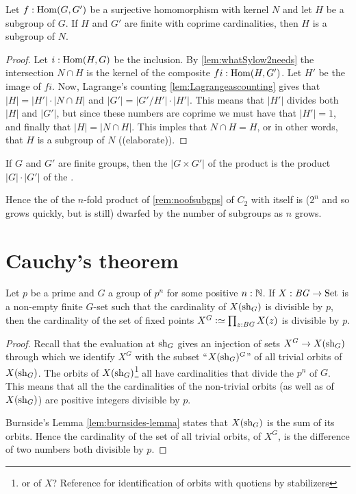 \begin{corollary}
  \label{cor:whatSylow2needs}Let $f:\Hom(G,G')$ be a surjective homomorphism with kernel $N$ and let $H$ be a subgroup of $G$.  If $H$ and $G'$ are finite with coprime cardinalities, then $H$ is a subgroup of $N$.
\end{corollary}
\begin{proof}
  Let $i:\Hom(H,G)$ be the inclusion.  By \cref{lem:whatSylow2needs} the intersection $N\cap H$ is the kernel of the composite $fi:\Hom(H,G')$.  Let $H'$ be the image of $fi$. Now, Lagrange's counting \cref{lem:Lagrangeascounting} gives that $|H|=|H'|\cdot |N\cap H|$ and $|G'|=|G'/H'|\cdot|H'|$.  This means that $|H'|$ divides both $|H|$ and $|G'|$, but since these numbers are coprime we must have that $|H'|=1$, and finally that $|H|=|N\cap H|$.  This imples that $N\cap H=H$, or in other words, that $H$ is a subgroup of $N$ ((elaborate)).
\end{proof}

\begin{corollary}
  If $G$ and $G'$ are finite groups, then the \gporder $|G\times G'|$ of the product is the product $|G|\cdot| G'|$ of the \gporders.
\end{corollary}
\begin{remark}
  Hence the \gporder of the $n$-fold product of \cref{rem:noofsubgps} of $C_2$ with itself is ($2^n$ and so grows quickly, but is still) dwarfed by the number of subgroups as $n$ grows.
\end{remark}


\section{Cauchy's theorem}
\begin{lemma}
  \label{lem:fixedptsize}
  Let $p$ be a prime and $G$ a group of \gporder $p^n$ for some positive $n:\mathbb{N}$.  If $X:\mathit{B}\mathit{G}\to\mathrm{Set}$ is a non-empty finite $G$-set such that the cardinality of $X(\mathrm{sh}_G)$ is divisible by $p$, then the cardinality of the set of fixed points $X^G\defequi\prod_{z:\BG}X(z)$ is divisible by $p$.
\end{lemma}
\begin{proof}
  Recall that the evaluation at $\mathrm{sh}_G$ gives an injection of sets $X^G\to X(\mathrm{sh}_G)$ through which we identify $X^G$ with the subset ``$X(\mathrm{sh}_G)^G$'' of all trivial orbits of $X(\mathrm{sh}_G)$.
 The orbits of $X(\mathrm{sh}_G)$\footnote{or of $X$?  Reference for identification of orbits with quotiens by stabilizers} all have cardinalities that divide the \gporder $p^n$ of $G$.  
This means that all the the cardinalities of the non-trivial orbits (as well as of $X(\mathrm{sh}_G)$) are positive integers divisible by $p$. 

 Burnside's Lemma \cref{lem:burnsides-lemma} states that $X(\mathrm{sh}_G)$ is the sum of its orbits.
Hence the cardinality of the set of all trivial orbits, \ie of $X^G$, is the difference of two numbers both divisible by $p$.  
\end{proof}

